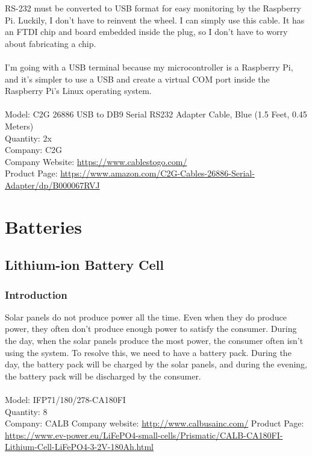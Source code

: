 RS-232 must be converted to USB format for easy monitoring by the Raspberry Pi. Luckily, I don’t have to reinvent the wheel. I can simply use this cable. It has an FTDI chip and board embedded inside the plug, so I don’t have to worry about fabricating a chip.\\
 \\
I’m going with a USB terminal because my microcontroller is a Raspberry Pi, and it’s simpler to use a USB and create a virtual COM port inside the Raspberry Pi’s Linux operating system.\\
 \\
Model: C2G 26886 USB to DB9 Serial RS232 Adapter Cable, Blue (1.5 Feet, 0.45 Meters)\\
Quantity: 2x\\
Company: C2G\\
Company Website: \href{https://www.cablestogo.com/}{https://www.cablestogo.com/} \\
Product Page: \href{https://www.amazon.com/C2G-Cables-26886-Serial-Adapter/dp/B000067RVJ}{https://www.amazon.com/C2G-Cables-26886-Serial-Adapter/dp/B000067RVJ}

\par

\section{Batteries}

\subsection{Lithium-ion Battery Cell}

\subsubsection{Introduction}

Solar panels do not produce power all the time. Even when they do produce power, they often don’t produce enough power to satisfy the consumer. During the day, when the solar panels produce the most power, the consumer often isn’t using the system. To resolve this, we need to have a battery pack. During the day, the battery pack will be charged by the solar panels, and during the evening, the battery pack will be discharged by the consumer.\\
 \\
Model: IFP71/180/278-CA180FI\\
Quantity: 8\\
Company:  CALB
Company website: \href{http://www.calbusainc.com/}{http://www.calbusainc.com/}
Product Page: \href{https://www.ev-power.eu/LiFePO4-small-cells/Prismatic/CALB-CA180FI-Lithium-Cell-LiFePO4-3-2V-180Ah.html}{ https://www.ev-power.eu/LiFePO4-small-cells/Prismatic/CALB-CA180FI-Lithium-Cell-LiFePO4-3-2V-180Ah.html}

